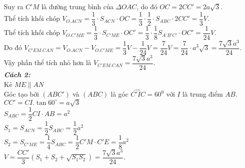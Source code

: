 \begin{ex}
{		Suy ra $C'M$ là đường trung bình của $\Delta OAC$, do đó $OC=2C{C}'=2a\sqrt{3}$.\\
		Thể tích khối chóp $V_{O.ACN}=\dfrac{1}{3}\cdot{S_{ACN}}\cdot OC=\dfrac{1}{3}\cdot\dfrac{1}{2}\cdot{S_{ABC}}\cdot 2C{C}'=\dfrac{1}{3}V$.\\
		Thể tích khối chóp $V_{O.C'ME}=\dfrac{1}{3}\cdot{S_{C'ME}}\cdot O{C}'=\dfrac{1}{3}\cdot\dfrac{1}{8}{S_{A'{B}'{C}'}}\cdot O{C}'=\dfrac{1}{24}V$.\\
		Do đó $V_{C'EM.CAN}=V_{O.ACN}-V_{O.C'ME}=\dfrac{1}{3}V-\dfrac{1}{24}V=\dfrac{7}{24}V=\dfrac{7}{24}\cdot{a^3}\sqrt{3}=\dfrac{7\sqrt{3}{a^3}}{24}$.\\
		Vậy phần thể tích nhỏ hơn là $V_{C'EM.CAN}=\dfrac{7\sqrt{3}{a^3}}{24}$.\\
		\textit{\textbf{Cách 2:}}\\
		Kẻ $ ME\parallel AN$\\
		Góc tạo bởi $\left(ABC'\right)$ và $\left(ABC\right)$ là góc $\widehat{C'IC}=60^0$ với $ I$ là trung điểm $ AB$.\\
		$ CC'=CI.\tan{60^\circ}=a\sqrt{3}$\\
		$S_{ABC}=\dfrac{1}{2}CI\cdot AB=a^2$\\
		$S_1=S_{ACN}=\dfrac{1}{2}{S_{ABC}}=\dfrac{1}{2}{a^2}$\\
		$S_2=S_{C'ME}=\dfrac{1}{4}{S_{ABC}}=\dfrac{1}{2}C'M\cdot C'E=\dfrac{1}{8}{a^2}$\\
		$V=\dfrac{CC'}{3}\left(S_1+S_2+\sqrt{S_1S_2}\right)=\dfrac{7\sqrt{3}{a^3}}{24}$.}
\end{ex}


